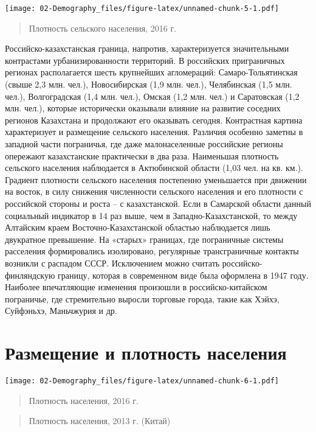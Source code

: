 \documentclass[]{book}
\begin{document}
\texttt{[image: 02-Demography\_files/figure-latex/unnamed-chunk-5-1.pdf]}

\begin{quote}
Плотность сельского населения, 2016 г.
\end{quote}

Российско-казахстанская граница, напротив, характеризуется значительными
контрастами урбанизированности территорий. В российских приграничных
регионах располагается шесть крупнейших агломераций: Самаро-Тольятинская
(свыше 2,3 млн. чел.), Новосибирская (1,9 млн. чел.), Челябинская (1,5
млн. чел.), Волгоградская (1,4 млн. чел.), Омская (1,2 млн. чел.) и
Саратовская (1,2 млн. чел.), которые исторически оказывали влияние на
развитие соседних регионов Казахстана и продолжают его оказывать
сегодня. Контрастная картина характеризует и размещение сельского
населения. Различия особенно заметны в западной части пограничья, где
даже малонаселенные российские регионы опережают казахстанские
практически в два раза. Наименьшая плотность сельского населения
наблюдается в Актюбинской области (1,03 чел. на кв. км.). Градиент
плотности сельского населения постепенно уменьшается при движении на
восток, в силу снижения численности сельского населения и его плотности
с российской стороны и роста -- с казахстанской. Если в Самарской
области данный социальный индикатор в 14 раз выше, чем в
Западно-Казахстанской, то между Алтайским краем Восточно-Казахстанской
областью наблюдается лишь двукратное превышение. На «старых» границах,
где пограничные системы расселения формировались изолировано, регулярные
трансграничные контакты возникли с распадом СССР. Исключением можно
считать российско-финляндскую границу, которая в современном виде была
оформлена в 1947 году. Наиболее впечатляющие изменения произошли в
российско-китайском пограничье, где стремительно выросли торговые
города, такие как Хэйхэ, Суйфэньхэ, Маньчжурия и др.

\section{Размещение и плотность населения}\label{demo-dens}

\texttt{[image: 02-Demography\_files/figure-latex/unnamed-chunk-6-1.pdf]}

\begin{quote}
Плотность населения, 2016 г.
\end{quote}

\begin{quote}
Плотность населения, 2013 г. (Китай)
\end{quote}
\end{document}
